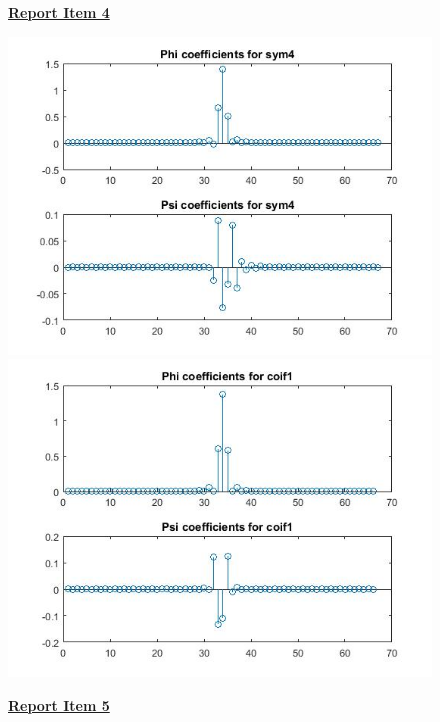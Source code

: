\documentclass{article}
\begin{document}
\begin{figure}[H]
\color{red}
\underline{\textbf{Report Item 4}}
\color{black}

\includegraphics[scale=.5]{3_sym4}
\includegraphics[scale=.5]{3_coif1}
\end{figure}

\begin{figure}[H]
\color{red}
\underline{\textbf{Report Item 5}}
\color{black}

\end{figure}
\end{document}
